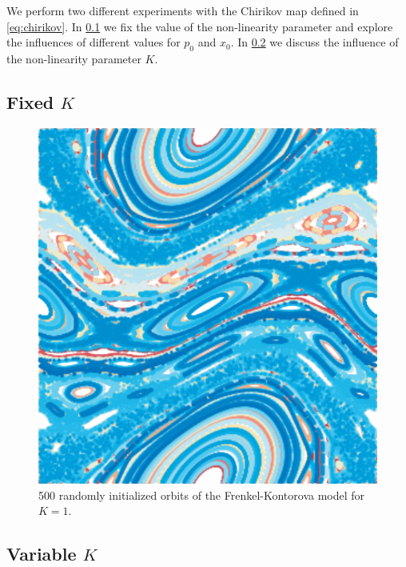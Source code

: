 We perform two different experiments with the Chirikov map defined in \cref{eq:chirikov}. In \cref{ss:fixed} we fix the value of the non-linearity parameter and explore the influences of different values for $p_0$ and $x_0$. In \cref{ss:variable} we discuss the influence of the non-linearity parameter $K$.

\subsection[]{Fixed $K$}
\label{ss:fixed}


	

	\begin{figure}
		\centering
		\includegraphics[width=0.9\columnwidth]{./img/assignment_a_pretty_low_res.pdf}
		\caption{500 randomly initialized orbits of the Frenkel-Kontorova model for $K = 1$.}
		\label{fig:a:pretty}
	\end{figure}

\subsection[]{Variable $K$}
\label{ss:variable}
